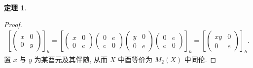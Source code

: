 \documentclass{MainStyle}
\theoremstyle{definition}
\theoremstyle{definition}
\theoremstyle{definition}
\theoremstyle{definition}
\theoremstyle{definition}
\theoremstyle{definition}
\theoremstyle{definition}
\newtheorem{theorem}{定理}
\theoremstyle{remark}
\theoremstyle{remark}
\begin{document}
\begin{theorem}
\begin{proof}
\begin{align*}
            \left[\begin{pmatrix}x&0\\0&y\end{pmatrix}\right]_h=\left[\begin{pmatrix}x&0\\0&e\end{pmatrix}\begin{pmatrix}0&e\\e&0\end{pmatrix}\begin{pmatrix}y&0\\0&e\end{pmatrix}\begin{pmatrix}0&e\\e&0\end{pmatrix}\right]_h=\left[\begin{pmatrix}xy&0\\0&e\end{pmatrix}\right]_h.
        \end{align*}
        置 $x$ 与 $y$ 为某酉元及其伴随, 从而 $X$ 中酉等价为 $M_2(X)$ 中同伦.
    \end{proof}
\end{theorem}
\end{document}

